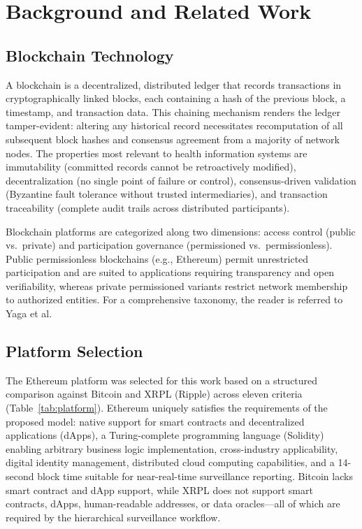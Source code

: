 \documentclass[AMA,LATO1COL]{WileyNJD-v2}
\begin{document}
\section{Background and Related Work}\label{sec:background}

\subsection{Blockchain Technology}\label{subsec:blockchain}

A blockchain is a decentralized, distributed ledger that records transactions in cryptographically linked blocks, each containing a hash of the previous block, a timestamp, and transaction data. This chaining mechanism renders the ledger tamper-evident: altering any historical record necessitates recomputation of all subsequent block hashes and consensus agreement from a majority of network nodes. The properties most relevant to health information systems are immutability (committed records cannot be retroactively modified), decentralization (no single point of failure or control), consensus-driven validation (Byzantine fault tolerance without trusted intermediaries), and transaction traceability (complete audit trails across distributed participants).

Blockchain platforms are categorized along two dimensions: access control (public vs.\ private) and participation governance (permissioned vs.\ permissionless). Public permissionless blockchains (e.g., Ethereum) permit unrestricted participation and are suited to applications requiring transparency and open verifiability, whereas private permissioned variants restrict network membership to authorized entities. For a comprehensive taxonomy, the reader is referred to Yaga et al.\cite{yaga2018blockchain}

\subsection{Platform Selection}\label{subsec:platform}

The Ethereum platform was selected for this work based on a structured comparison against Bitcoin and XRPL (Ripple) across eleven criteria (Table~\ref{tab:platform}). Ethereum uniquely satisfies the requirements of the proposed model: native support for smart contracts and decentralized applications (dApps), a Turing-complete programming language (Solidity) enabling arbitrary business logic implementation, cross-industry applicability, digital identity management, distributed cloud computing capabilities, and a 14-second block time suitable for near-real-time surveillance reporting. Bitcoin lacks smart contract and dApp support, while XRPL does not support smart contracts, dApps, human-readable addresses, or data oracles---all of which are required by the hierarchical surveillance workflow.
\end{document}
